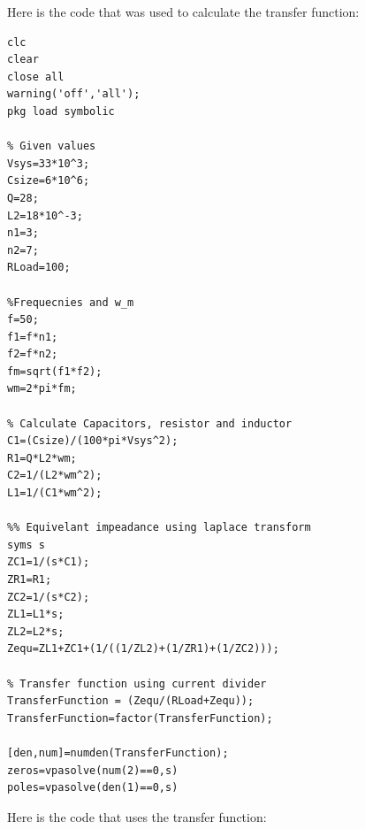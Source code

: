 \documentclass[11pt]{article}
\begin{document}
Here is the code that was used to calculate the transfer function:
\begin{verbatim}
clc
clear
close all
warning('off','all');
pkg load symbolic

% Given values
Vsys=33*10^3;
Csize=6*10^6;
Q=28;
L2=18*10^-3;
n1=3;
n2=7;
RLoad=100;

%Frequecnies and w_m
f=50;
f1=f*n1;
f2=f*n2;
fm=sqrt(f1*f2);
wm=2*pi*fm;

% Calculate Capacitors, resistor and inductor
C1=(Csize)/(100*pi*Vsys^2);
R1=Q*L2*wm;
C2=1/(L2*wm^2);
L1=1/(C1*wm^2);

%% Equivelant impeadance using laplace transform
syms s
ZC1=1/(s*C1);
ZR1=R1;
ZC2=1/(s*C2);
ZL1=L1*s;
ZL2=L2*s;
Zequ=ZL1+ZC1+(1/((1/ZL2)+(1/ZR1)+(1/ZC2)));

% Transfer function using current divider
TransferFunction = (Zequ/(RLoad+Zequ));
TransferFunction=factor(TransferFunction);

[den,num]=numden(TransferFunction);
zeros=vpasolve(num(2)==0,s)
poles=vpasolve(den(1)==0,s)

\end{verbatim}
Here is the code that uses the transfer function:
\end{document}
